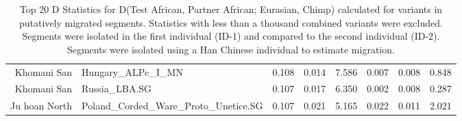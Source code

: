 \begin{table}[ht]
\begin{tabular}{rlrrrrrr}
  Khomani San & Hungary\_ALPc\_I\_MN & 0.108 & 0.014 & 7.586 & 0.007 & 0.008 & 0.848 \\ 
  Khomani San & Russia\_LBA.SG & 0.107 & 0.017 & 6.350 & 0.002 & 0.008 & 0.287 \\ 
  Ju hoan North & Poland\_Corded\_Ware\_Proto\_Unetice.SG & 0.107 & 0.021 & 5.165 & 0.022 & 0.011 & 2.021 \\ 
   \hline
\end{tabular}
\caption{Top 20 D Statistics for D(Test African, Partner African; Eurasian, Chimp) calculated for variants in putatively migrated segments. Statistics with less than a thousand combined variants were excluded. Segments were isolated in the first individual (ID-1) and compared to the second individual (ID-2). Segments were isolated using a Han Chinese individual to estimate migration.} 
\label{dstats:top20}
\end{table}
